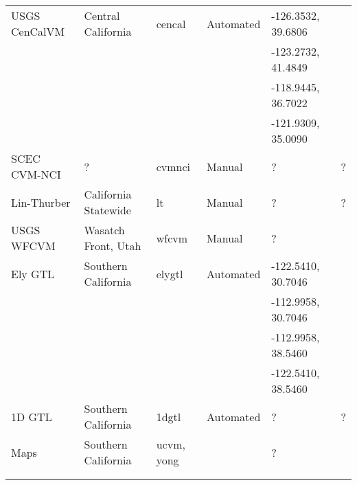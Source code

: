\begin{table*}[t]
\begin{tabular}[]{lllllp{1.25in}}
USGS CenCalVM      & Central California    & cencal        &  Automated   & -126.3532, 39.6806 & \citet{Brocher_2005_Tech}    \\
                   &                       &               &              & -123.2732, 41.4849 & \citet{Brocher_2006_Proc}    \\
                   &                       &               &              & -118.9445, 36.7022 &                              \\
                   &                       &               &              & -121.9309, 35.0090 &                              \\
SCEC CVM-NCI       & ?                     & cvmnci        &  Manual      & ?                  & ?                            \\
Lin-Thurber        & California Statewide  & lt            &  Manual      & ?                  & ?                            \\
USGS WFCVM         & Wasatch Front, Utah   & wfcvm         &  Manual      & ?                  & \citet{Magistrale_2006_Tech} \\
\hline
Ely GTL            & Southern California   & elygtl        &  Automated   & -122.5410, 30.7046 & \citet{Ely_2010_AGU}         \\
                   &                       &               &              & -112.9958, 30.7046 &                              \\
                   &                       &               &              & -112.9958, 38.5460 &                              \\
                   &                       &               &              & -122.5410, 38.5460 &                              \\
1D GTL             & Southern California   & 1dgtl         &  Automated   & ?                  & ?                            \\
\hline
\vsthirty{} Maps   & Southern California   & ucvm, yong    &              & ?                  & \citet{Wills_2006_BSSA}      \\
                   &                       &               &              &                    & \citet{Wald_2007_BSSA}       \\
                   &                       &               &              &                    & \citet{Yong_2012_BSSA}       \\
\hline
\end{tabular}
\label{tab:cvms}
\end{table*}


